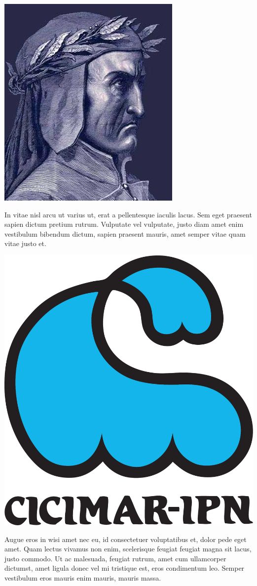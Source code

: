 \documentclass[12pt]{article}
\begin{document}
\includegraphics[width=0.7\linewidth]{img/dante}

In vitae nisl arcu ut varius ut, erat a pellentesque iaculis lacus. Sem eget praesent sapien dictum pretium rutrum. Vulputate vel vulputate, justo diam amet enim vestibulum bibendum dictum, sapien praesent mauris, amet semper vitae quam vitae justo et.

\includegraphics[width=0.7\linewidth]{img/cicimar}

Augue eros in wisi amet nec eu, id consectetuer voluptatibus et, dolor pede eget amet. Quam lectus vivamus non enim, scelerisque feugiat feugiat magna sit lacus, justo commodo. Ut ac malesuada, feugiat rutrum, amet cum ullamcorper dictumst, amet ligula donec vel mi tristique est, eros condimentum leo. Semper vestibulum eros mauris enim mauris, mauris massa. 
\end{document}
